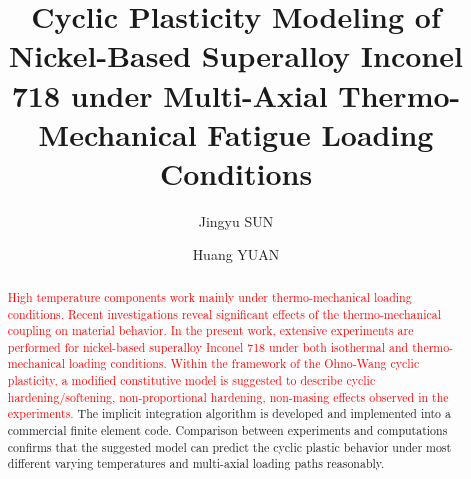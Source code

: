 \documentclass[preprint,5p,twocolumn,11pt,sort&compress]{elsarticle}
\newcommand{\marked}[1]{\textcolor{red}{#1}}
\begin{document}



\begin{frontmatter}



\title{Cyclic Plasticity Modeling of Nickel-Based Superalloy Inconel 718 under Multi-Axial Thermo-Mechanical Fatigue Loading Conditions}


\author{Jingyu SUN}
\author{Huang YUAN}

\address[label1]{School of Aerospace Engineering, Tsinghua University, Beijing, China}

\begin{abstract}
\marked{High temperature components work mainly under thermo-mechanical loading conditions. Recent investigations reveal significant effects of the thermo-mechanical coupling on material behavior. In the present work, extensive experiments are performed for nickel-based superalloy Inconel 718 under both isothermal and thermo-mechanical loading conditions. Within the framework of the Ohno-Wang cyclic plasticity, a modified constitutive model is suggested to describe cyclic hardening/softening, non-proportional hardening, non-masing effects observed in the experiments.} The implicit integration algorithm is developed and implemented into a commercial finite element code. Comparison between experiments and computations confirms that the suggested model can predict the cyclic plastic behavior under most different varying temperatures and multi-axial loading paths reasonably. 
\end{abstract}


\end{frontmatter}
\end{document}
